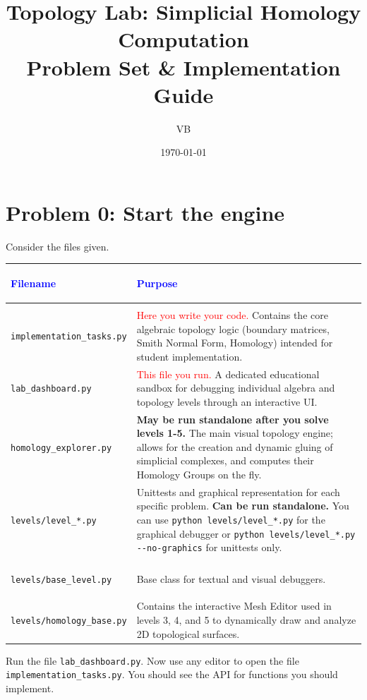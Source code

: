 \documentclass[11pt]{article}
\title{Topology Lab: Simplicial Homology Computation \\ \large Problem Set \& Implementation Guide}
\author{VB}
\date{\today}
\begin{document}
\maketitle

\section*{Problem 0: Start the engine}

Consider the files given.
\begin{center}
\renewcommand{\arraystretch}{1.5}
\begin{tabularx}{\textwidth}{@{} >{\bfseries\raggedright\arraybackslash}p{5.5cm} X @{}}
\toprule
\textcolor{blue}{Filename} & \textcolor{blue}{Purpose} \\ \midrule
\multicolumn{2}{@{}l}{\textbf{Direct Interaction}} \\ \midrule
\lstinline|implementation_tasks.py| & \textcolor{red}{Here you write your code.} Contains the core algebraic topology logic (boundary matrices, Smith Normal Form, Homology) intended for student implementation. \\
\lstinline|lab_dashboard.py| & \textcolor{red}{This file you run.} A dedicated educational sandbox for debugging individual algebra and topology levels through an interactive UI. \\
\lstinline|homology_explorer.py| & \textbf{May be run standalone after you solve levels 1-5.} The main visual topology engine; allows for the creation and dynamic gluing of simplicial complexes, and computes their Homology Groups on the fly. \\
\lstinline|levels/level_*.py| & Unittests and graphical representation for each specific problem. \textbf{Can be run standalone.} You can use \lstinline|python levels/level_*.py| for the graphical debugger or \lstinline|python levels/level_*.py --no-graphics| for unittests only. \\ \midrule
\multicolumn{2}{@{}l}{\textbf{Under the Hood}} \\ \midrule
\lstinline|levels/base_level.py| & Base class for textual and visual debuggers.\\
\lstinline|levels/homology_base.py| & Contains the interactive Mesh Editor used in levels 3, 4, and 5 to dynamically draw and analyze 2D topological surfaces.\\
\bottomrule
\end{tabularx}
\end{center}

Run the file \lstinline|lab_dashboard.py|. Now use any editor to open the file \lstinline|implementation_tasks.py|. You should see the API for functions you should implement.
\end{document}
